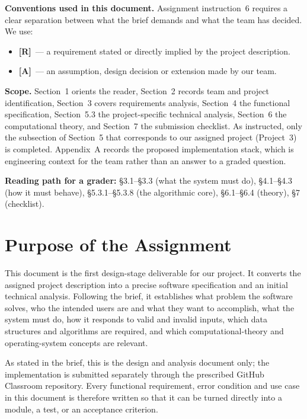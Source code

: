 \documentclass[11pt,a4paper]{article}
\newcommand{\R}{\textcolor{reqc}{\textbf{[R]}}}     %
\newcommand{\A}{\textcolor{asmc}{\textbf{[A]}}}     %
\begin{document}
\medskip
\noindent\textbf{Conventions used in this document.} Assignment instruction~6 requires a
clear separation between what the brief demands and what the team has decided. We use:
\begin{itemize}[leftmargin=1.4em,topsep=2pt,itemsep=1pt]
  \item \R\ --- a requirement stated or directly implied by the project description.
  \item \A\ --- an assumption, design decision or extension made by our team.
\end{itemize}
\noindent\textbf{Scope.} Section~1 orients the reader, Section~2 records team and project
identification, Section~3 covers requirements analysis, Section~4 the functional
specification, Section~5.3 the project-specific technical analysis, Section~6 the
computational theory, and Section~7 the submission checklist. As instructed, only the
subsection of Section~5 that corresponds to our assigned project (Project~3) is
completed. Appendix~A records the proposed implementation stack, which is engineering
context for the team rather than an answer to a graded question.

\medskip
\noindent\textbf{Reading path for a grader:} \S3.1--\S3.3 (what the system must do),
\S4.1--\S4.3 (how it must behave), \S5.3.1--\S5.3.8 (the algorithmic core),
\S6.1--\S6.4 (theory), \S7 (checklist).

\clearpage

\section{Purpose of the Assignment}

This document is the first design-stage deliverable for our project. It converts the
assigned project description into a precise software specification and an initial
technical analysis. Following the brief, it establishes what problem the software solves,
who the intended users are and what they want to accomplish, what the system must do, how
it responds to valid and invalid inputs, which data structures and algorithms are required,
and which computational-theory and operating-system concepts are relevant.

As stated in the brief, this is the design and analysis document only; the implementation
is submitted separately through the prescribed GitHub Classroom repository. Every
functional requirement, error condition and use case in this document is therefore written
so that it can be turned directly into a module, a test, or an acceptance criterion.
\end{document}
